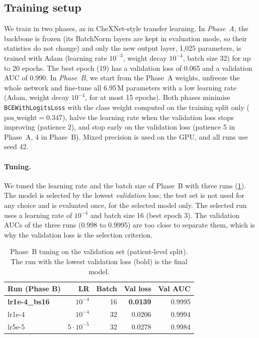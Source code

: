 \subsection{Training setup}
\label{sec:densenet-training}
We train in two phases, as in CheXNet-style transfer learning.
In \emph{Phase~A}, the backbone is frozen (its BatchNorm layers are kept in evaluation mode, so their statistics do not change) and only the new output layer, 1,025 parameters, is trained
with Adam (learning rate $10^{-3}$, weight decay $10^{-4}$, batch size 32) for up to 20 epochs.
The best epoch (19) has a validation loss of 0.065 and a validation AUC of 0.990.
In \emph{Phase~B}, we start from the Phase~A weights, unfreeze the whole network and fine-tune all 6.95\,M parameters with a low learning rate
(Adam, weight decay $10^{-4}$, for at most 15 epochs).
Both phases minimise \texttt{BCEWithLogitsLoss} with the class weight computed on the training split only ($\text{pos\_weight}=0.347$),
halve the learning rate when the validation loss stops improving (patience 2), and stop early on the validation loss (patience 5 in Phase~A, 4 in Phase~B).
Mixed precision is used on the GPU, and all runs use seed 42.

\paragraph{Tuning.}
We tuned the learning rate and the batch size of Phase~B with three runs (\cref{tab:tuning}).
The model is selected by the lowest \emph{validation} loss; the test set is not used for any choice and is evaluated once, for the selected model only.
The selected run uses a learning rate of $10^{-4}$ and batch size 16 (best epoch 3).
The validation AUCs of the three runs (0.998 to 0.9995) are too close to separate them, which is why the validation loss is the selection criterion.

\begin{table}[t]
  \centering
  \small
  \begin{tabular}{lrrrr}
    \toprule
    Run (Phase B) & LR & Batch & Val loss & Val AUC \\
    \midrule
    \textbf{lr1e-4\_bs16} & $10^{-4}$ & 16 & \textbf{0.0139} & 0.9995 \\
    lr1e-4                & $10^{-4}$ & 32 & 0.0206 & 0.9994 \\
    lr5e-5                & $5\cdot10^{-5}$ & 32 & 0.0278 & 0.9984 \\
    \bottomrule
  \end{tabular}
  \caption{Phase~B tuning on the validation set (patient-level split). The run with the lowest validation loss (bold) is the final model.}
  \label{tab:tuning}
\end{table}

